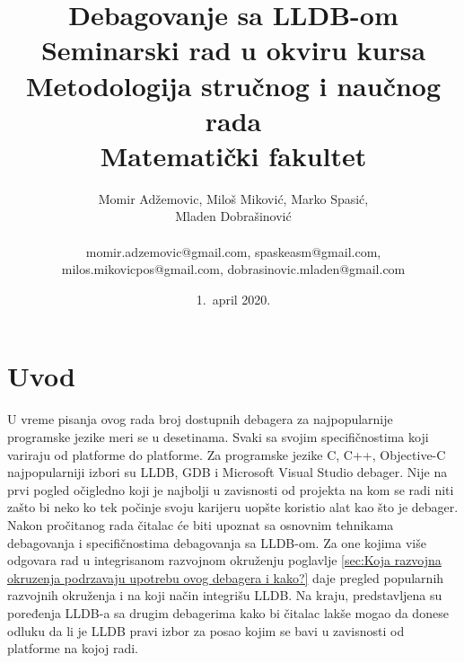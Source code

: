 \documentclass[a4paper]{article}
\begin{document}
\title{Debagovanje sa LLDB-om\\ \small{Seminarski rad u okviru kursa\\Metodologija stručnog i naučnog rada\\ Matematički fakultet}}

\author{Momir Adžemovic, Miloš Miković, Marko Spasić,\\ Mladen Dobrašinović\\ \\ \small momir.adzemovic@gmail.com, spaskeasm@gmail.com,\\ \small milos.mikovicpos@gmail.com, dobrasinovic.mladen@gmail.com}

\date{1.~april 2020.}

\maketitle


\tableofcontents

\newpage

\section{Uvod}
\label{sec:uvod}

U vreme pisanja ovog rada broj dostupnih debagera za najpopularnije programske jezike meri se u desetinama. Svaki sa svojim specifičnostima koji variraju od platforme do platforme. Za programske jezike C, C++, Objective-C najpopularniji izbori su LLDB, GDB i Microsoft Visual Studio debager. Nije na prvi pogled očigledno koji je najbolji u zavisnosti od projekta na kom se radi niti zašto bi neko ko tek počinje svoju karijeru uopšte koristio alat kao što je debager.
Nakon pročitanog rada čitalac će biti upoznat sa osnovnim tehnikama debagovanja i specifičnostima debagovanja sa LLDB-om. Za one kojima više odgovara rad u integrisanom razvojnom okruženju poglavlje \ref{sec:Koja razvojna okruzenja podrzavaju upotrebu ovog debagera i kako?} daje pregled popularnih razvojnih okruženja i na koji način integrišu LLDB. Na kraju, predstavljena su poređenja LLDB-a sa drugim debagerima kako bi čitalac lakše mogao da donese odluku da li je LLDB pravi izbor za posao kojim se bavi u zavisnosti od platforme na kojoj radi. 
\end{document}
